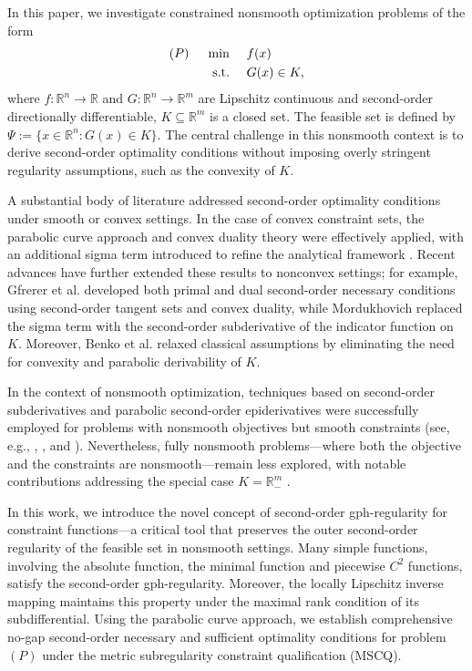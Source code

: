 \documentclass[11pt]{article}
\theoremstyle{definition}
\theoremstyle{remark}
\numberwithin{equation}{section}
\begin{document}
In this paper, we investigate constrained nonsmooth optimization problems of the form
\begin{align*}
(P)~~~~\min &~~~~ f(x)\\
{\rm s.t.}&~~~~ G(x)\in K,
\end{align*}
where $f:\mathbb{R}^n\to \mathbb{R}$ and $G:\mathbb{R}^n\to \mathbb{R}^m$ are Lipschitz continuous and second-order directionally differentiable, $K\subseteq \mathbb{R}^m$ is a closed set.
The feasible set is defined by $\Psi:=\{x\in \mathbb{R}^n:G(x)\in K\}$.
The central challenge in this nonsmooth context is to derive second-order optimality conditions without imposing overly stringent regularity assumptions, such as the convexity of  $K$.




A substantial body of literature  addressed second-order optimality conditions under smooth or convex settings. In the case of convex constraint sets, the parabolic curve approach  and convex duality theory were   effectively applied, with an additional sigma term introduced to refine the analytical framework \cite{Bonnans,Bonnans 99,Cominetti 90,Shapiro 97}.
Recent advances have further extended these results to nonconvex settings; for example, Gfrerer et al. \cite{Gfrerer Ye and Zhou 22} developed both primal and dual second-order necessary conditions using second-order tangent sets and convex duality, while Mordukhovich \cite{Mordukhovich 21} replaced the sigma term with the second-order subderivative of the indicator function on $K$.
Moreover, Benko et al. \cite{Benko Gfrerer Zhou 23} relaxed classical assumptions by eliminating the need for convexity and parabolic derivability of $K$.
 
In the context of nonsmooth optimization, techniques based on second-order subderivatives and parabolic second-order epiderivatives were successfully employed for problems with nonsmooth objectives but smooth constraints (see, e.g., \cite[Section 3.3.5]{Bonnans}, \cite{Cominetti 91}, \cite{Rockafellar 89} and \cite[Chapter 13]{Rockafellar}).
Nevertheless, fully nonsmooth problems—where both the objective and the constraints are nonsmooth—remain less explored, with notable contributions addressing the special case $K=\mathbb{R}^m_-$ \cite{Ruckmann}.


In this work, we introduce the novel concept of second-order gph-regularity  for constraint functions—a critical tool that preserves the outer second-order regularity of the feasible set in nonsmooth settings.
Many simple functions, involving the absolute function, the minimal function and  piecewise $C^2$ functions, satisfy
the second-order gph-regularity.
Moreover, the locally Lipschitz inverse mapping maintains this property  under the  maximal rank condition of its subdifferential.
Using the parabolic curve approach, we establish comprehensive no-gap second-order necessary and sufficient optimality conditions for problem $(P)$ under the metric subregularity constraint qualification (MSCQ).
\end{document}
